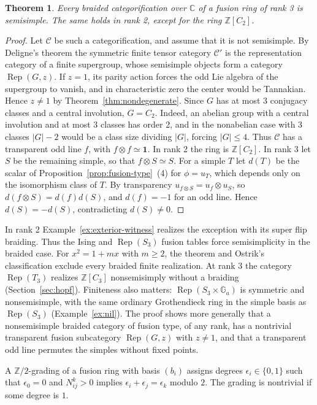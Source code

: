 \documentclass[11pt,reqno]{amsart}
\newtheorem{theorem}{Theorem}[section]
\theoremstyle{definition}
\newcommand{\one}{\mathbf 1}
\newcommand{\C}{\mathcal C}
\newcommand{\CC}{\mathbb C}
\newcommand{\ZZ}{\mathbb Z}
\newcommand{\Ga}{\mathbb G_a}
\newcommand{\Rep}{\operatorname{Rep}}
\begin{document}
\begin{theorem}\label{thm:braided-exclusion}
Every braided categorification over $\CC$ of a fusion ring of rank 3 is semisimple. The same holds in rank 2, except for the ring $\ZZ[C_2]$.
\end{theorem}

\begin{proof}
Let $\C$ be such a categorification, and assume that it is not semisimple. By Deligne's theorem \cite[\S9.11]{EGNO} the symmetric finite tensor category $\C'$ is the representation category of a finite supergroup, whose semisimple objects form a category $\Rep(G,z)$. If $z=1$, its parity action forces the odd Lie algebra of the supergroup to vanish, and in characteristic zero the center would be Tannakian. Hence $z\ne1$ by Theorem~\ref{thm:nondegenerate}. Since $G$ has at most 3 conjugacy classes and a central involution, $G=C_2$. Indeed, an abelian group with a central involution and at most 3 classes has order 2, and in the nonabelian case with 3 classes $|G|-2$ would be a class size dividing $|G|$, forcing $|G|\le4$. Thus $\C$ has a transparent odd line $f$, with $f\otimes f\simeq\one$. In rank 2 the ring is $\ZZ[C_2]$. In rank 3 let $S$ be the remaining simple, so that $f\otimes S\simeq S$. For a simple $T$ let $d(T)$ be the scalar of Proposition~\ref{prop:fusion-type}~(4) for $\phi=u_T$, which depends only on the isomorphism class of $T$. By transparency $u_{f\otimes S}=u_f\otimes u_S$, so $d(f\otimes S)=d(f)d(S)$, and $d(f)=-1$ for an odd line. Hence $d(S)=-d(S)$, contradicting $d(S)\neq0$.
\end{proof}

In rank 2 Example~\ref{ex:exterior-witness} realizes the exception with its super flip braiding. Thus the Ising and $\Rep(S_3)$ fusion tables force semisimplicity in the braided case. For $x^2=1+mx$ with $m\ge2$, the theorem and Ostrik's classification \cite[Main Theorem]{O2} exclude every braided finite realization. At rank 3 the category $\Rep(T_3)$ realizes $\ZZ[C_3]$ nonsemisimply without a braiding (Section~\ref{sec:hopf}). Finiteness also matters: $\Rep(S_3\times\Ga)$ is symmetric and nonsemisimple, with the same ordinary Grothendieck ring in the simple basis as $\Rep(S_3)$ (Example~\ref{ex:nil}). The proof shows more generally that a nonsemisimple braided category of fusion type, of any rank, has a nontrivial transparent fusion subcategory $\Rep(G,z)$ with $z\neq1$, and that a transparent odd line permutes the simples without fixed points.

A $\ZZ/2$-grading of a fusion ring with basis $(b_i)$ assigns degrees $\epsilon_i\in\{0,1\}$ such that $\epsilon_0=0$ and $N_{ij}^k>0$ implies $\epsilon_i+\epsilon_j=\epsilon_k$ modulo $2$. The grading is nontrivial if some degree is $1$.
\end{document}
